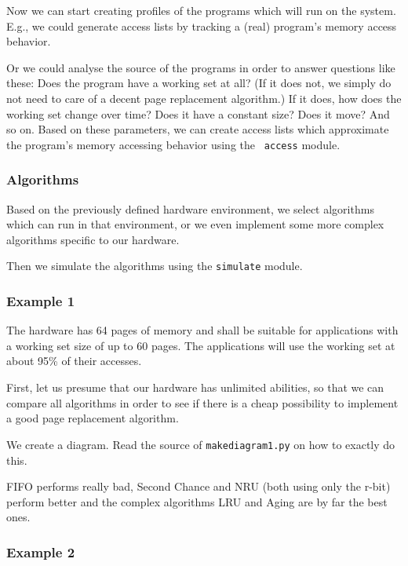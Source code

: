 \documentclass[a4paper,12pt,BCOR2cm,DIV12]{scrartcl}
\begin{document}
Now we can start creating profiles of the programs which will run on
the system.  E.g., we could generate access lists by tracking a (real)
program's memory access behavior.

Or we could analyse the source of the programs in order to answer
questions like these: Does the program have a working set at all?  (If
it does not, we simply do not need to care of a decent page
replacement algorithm.)  If it does, how does the working set change
over time?  Does it have a constant size?  Does it move?  And so on.
Based on these parameters, we can create access lists which
approximate the program's memory accessing behavior using the {\tt
access} module.

\subsubsection{Algorithms}

Based on the previously defined hardware environment, we select
algorithms which can run in that environment, or we even implement
some more complex algorithms specific to our hardware.

Then we simulate the algorithms using the {\tt simulate} module.

\subsubsection{Example 1}

The hardware has 64 pages of memory and shall be suitable for
applications with a working set size of up to 60 pages.  The
applications will use the working set at about 95\% of their accesses.

First, let us presume that our hardware has unlimited abilities, so
that we can compare all algorithms in order to see if there is a cheap
possibility to implement a good page replacement algorithm.

We create a diagram.  Read the source of {\tt makediagram1.py} on how
to exactly do this.

\vspace{5mm}



\vspace{5mm}

FIFO performs really bad, Second Chance and NRU (both using only the
r-bit) perform better and the complex algorithms LRU and Aging are
by far the best ones.

\subsubsection{Example 2}
\end{document}
